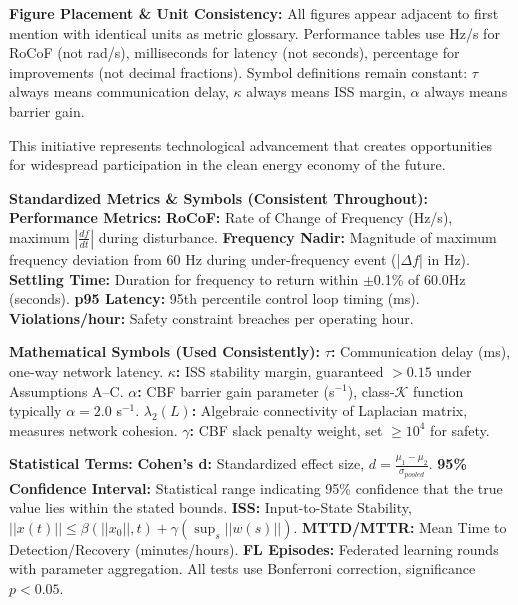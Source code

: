 \documentclass[12pt]{article}
\begin{document}
\textbf{Figure Placement \& Unit Consistency:} All figures appear adjacent to first mention with identical units as metric glossary. Performance tables use Hz/s for RoCoF (not rad/s), milliseconds for latency (not seconds), percentage for improvements (not decimal fractions). Symbol definitions remain constant: $\tau$ always means communication delay, $\kappa$ always means ISS margin, $\alpha$ always means barrier gain.

This initiative represents technological advancement that creates opportunities for widespread participation in the clean energy economy of the future.

\textbf{Standardized Metrics \& Symbols (Consistent Throughout):}
\textbf{Performance Metrics:} \textbf{RoCoF:} Rate of Change of Frequency (Hz/s), maximum $|\frac{df}{dt}|$ during disturbance. \textbf{Frequency Nadir:} Magnitude of maximum frequency deviation from 60 Hz during under-frequency event (|$\Delta f$| in Hz). \textbf{Settling Time:} Duration for frequency to return within $\pm$0.1\% of 60.0Hz (seconds). \textbf{p95 Latency:} 95th percentile control loop timing (ms). \textbf{Violations/hour:} Safety constraint breaches per operating hour.

\textbf{Mathematical Symbols (Used Consistently):} \textbf{$\tau$:} Communication delay (ms), one-way network latency. \textbf{$\kappa$:} ISS stability margin, guaranteed $>0.15$ under Assumptions A--C. \textbf{$\alpha$:} CBF barrier gain parameter (s$^{-1}$), class-$\mathcal{K}$ function typically $\alpha=2.0$ s$^{-1}$. \textbf{$\lambda_2(L)$:} Algebraic connectivity of Laplacian matrix, measures network cohesion. \textbf{$\gamma$:} CBF slack penalty weight, set $\geq 10^4$ for safety.

\textbf{Statistical Terms:} \textbf{Cohen's d:} Standardized effect size, $d = \frac{\mu_1-\mu_2}{\sigma_{pooled}}$. \textbf{95\% Confidence Interval:} Statistical range indicating 95\% confidence that the true value lies within the stated bounds. \textbf{ISS:} Input-to-State Stability, $||x(t)|| \leq \beta(||x_0||,t) + \gamma(\sup_s ||w(s)||)$. \textbf{MTTD/MTTR:} Mean Time to Detection/Recovery (minutes/hours). \textbf{FL Episodes:} Federated learning rounds with parameter aggregation. All tests use Bonferroni correction, significance $p<0.05$.



\end{document}
